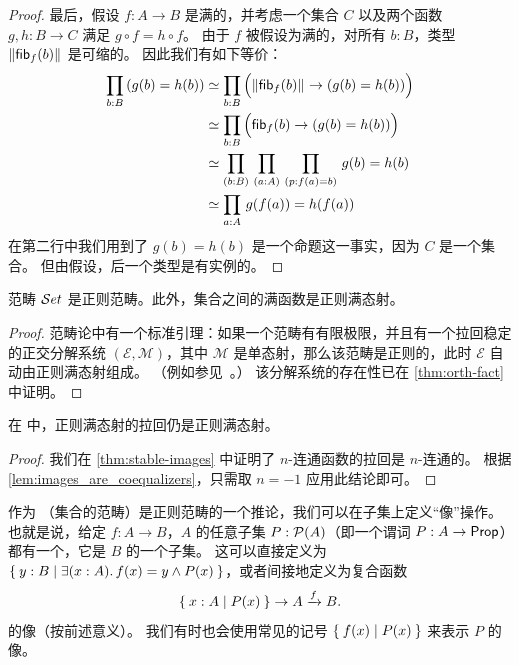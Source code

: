 \begin{proof}
最后，假设 $f:A\to B$ 是满的，并考虑一个集合 $C$ 以及两个函数 $g,h:B\to C$ 满足 $g\circ f = h\circ f$。
由于 $f$ 被假设为满的，对所有 $b:B$，类型 $\mathopen{}\left\Vert {\mathsf{fib}}_{f}(b)\right\Vert_{}\mathclose{}$ 是可缩的。
因此我们有如下等价：
\begin{align*}
\prd{b:B} (g(b)= h(b))
& \eqvsym \prd{b:B} \Parens{\brck{\hfib f b} \to (g(b)= h(b))}\\
& \eqvsym \prd{b:B} \Parens{\hfib f b \to (g(b)= h(b))}\\
& \eqvsym \prd{b:B}{a:A}{p:f(a)= b} g(b)= h(b)\\
& \eqvsym \prd{a:A} g(f(a))= h(f(a))
\end{align*}
在第二行中我们用到了 $g(b)=h(b)$ 是一个命题这一事实，因为 $C$ 是一个集合。
但由假设，后一个类型是有实例的。
\end{proof}


\begin{thm}\label{thm:set_regular}\label{lem:images_are_coequalizers}
范畴 $\mathcal{S}et$ 是正则范畴。此外，集合之间的满函数是正则满态射。
\end{thm}

\begin{proof}
范畴论中有一个标准引理：如果一个范畴有有限极限，并且有一个拉回稳定的正交分解系统 $(\mathcal{E},\mathcal{M})$，其中 $\mathcal{M}$ 是单态射，那么该范畴是正则的，此时 $\mathcal{E}$ 自动由正则满态射组成。
（例如参见~\cite[A1.3.4]{elephant}。）
该分解系统的存在性已在 \cref{thm:orth-fact} 中证明。
\end{proof}

\begin{lem}\label{lem:pb_of_coeq_is_coeq}
在 \uset 中，正则满态射的拉回仍是正则满态射。
\end{lem}

\begin{proof}
  我们在 \cref{thm:stable-images} 中证明了 $n$-连通函数的拉回是 $n$-连通的。
  根据 \cref{lem:images_are_coequalizers}，只需取 $n=-1$ 应用此结论即可。
\end{proof}

作为 \uset（集合的范畴）是正则范畴的一个推论，我们可以在子集上定义“像”操作。
也就是说，给定 $f:A\to B$，$A$ 的任意子集 $P:\mathcal{P}(A)$（即一个谓词 $P:A\to \mathsf{Prop}$）都有一个，它是 $B$ 的一个子集。
这可以直接定义为 $\setof{ y:B | \exis{x:A} f(x)=y \land P(x)}$，或者间接地定义为复合函数
\[ \Set{ x:A | P(x) } \to A \xrightarrow{f} B.\]
的像（按前述意义）。
我们有时也会使用常见的记号 $\Set{f(x) | P(x)}$ 来表示 $P$ 的像。

